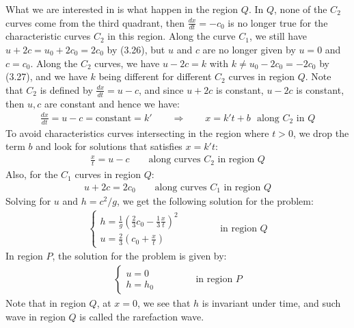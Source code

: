 \documentclass[11pt]{book}
\theoremstyle{break}
\theoremstyle{break}
\begin{document}
What we are interested in is what happen in the region $Q$. In $Q$, none of the $C_2$ curves come from the third quadrant, then $\frac{dx}{dt} = -c_0$ is no longer true for the characteristic curves $C_2$ in this region. Along the curve $C_1$, we still have $u+2c = u_0+2c_0 = 2c_0 $ by (3.26), but $u$ and $c$ are no longer given by $u=0$ and $c = c_0$. Along the $C_2$ curves, we have $u-2c = k$ with $k \neq u_0-2c_0 = -2c_0$ by (3.27), and we have $k$ being different for different $C_2$ curves in region $Q$. Note that $C_2$ is defined by $\frac{dx}{dt} = u-c$, and since $u+2c$ is constant, $u-2c$ is constant, then $u, c$ are constant and hence we have:
\begin{align*}
\frac{dx}{dt} = u-c = \text{constant} = k' \qquad \Rightarrow \qquad x = k' t + b \ \ \ \text{along }C_2 \text{ in }Q
\end{align*}
To avoid characteristics curves intersecting in the region where $t>0$, we drop the term $b$ and look for solutions that satisfies $x = k't$:
\begin{align*}
\frac{x}{t} = u-c \qquad \text{along curves }C_2 \text{ in region }Q
\end{align*}
Also, for the $C_1$ curves in region $Q$:
\begin{align*}
u + 2c = 2c_0\qquad \text{along curves }C_1 \text{ in region }Q
\end{align*}
Solving for $u$ and $h=c^2/g$, we get the following solution for the problem:
\begin{align}
\begin{cases}
h=\frac{1}{g}\left( \frac{2}{3}c_0 - \frac{1}{3}\frac{x}{t}\right)^2 \\
u = \frac{2}{3}\left(c_0 + \frac{x}{t}\right)
\end{cases} \qquad\qquad \text{in region }Q
\end{align}
In region $P$, the solution for the problem is given by:
\begin{align*}
\begin{cases}
u = 0 \\
h =h_0
\end{cases} \qquad\qquad \text{in region }P
\end{align*}
Note that in region $Q$, at $x = 0$, we see that $h$ is invariant under time, and such wave in region $Q$ is called the rarefaction wave. \\
\end{document}
